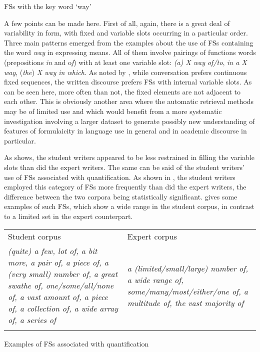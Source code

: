 \begin{table}
\caption{FSs with the key word ‘way’}
\label{tab:key:9}
\end{table}

A few points can be made here. First of all, again, there is a great deal of variability in form, with fixed and variable slots occurring in a particular order. Three main patterns emerged from the examples about the use of FSs containing the word \textit{way} in expressing means. All of them involve pairings of functions words (prepositions \textit{in} and o\textit{f}) with at least one variable slot: \textit{(a) X way of/to}, \textit{in a X way}, (\textit{the}) \textit{X way in which}. As noted by \citet{Biber2009}, while conversation prefers continuous fixed sequences, the written discourse prefers FSs with internal variable slots. As can be seen here, more often than not, the fixed elements are not adjacent to each other. This is obviously another area where the automatic retrieval methods may be of limited use and which would benefit from a more systematic investigation involving a larger dataset to generate possibly new understanding of features of formulaicity in language use in general and in academic discourse in particular. 

As  shows, the student writers appeared to be less restrained in filling the variable slots than did the expert writers. The same can be said of the student writers’ use of FSs associated with quantification. As shown in , the student writers employed this category of FSs more frequently than did the expert writers, the difference between the two corpora being statistically significant.  gives some examples of such FSs, which show a wide range in the student corpus, in contrast to a limited set in the expert counterpart. 


\begin{tabularx}{\textwidth}{XX}

\lsptoprule

Student corpus & Expert corpus\\
\textit{(quite) a few, lot of, a bit more, a pair of, a piece of, a (very small) number of, a great swathe of, one/some/all/none of, a vast amount of, a piece of, a collection of, a wide array of, a series of} & \textit{a (limited/small/large) number of, a wide range of, some/many/most/either/one of, a multitude of, the vast majority of}\\
\lspbottomrule
\end{tabularx}
\begin{table}
\caption{Examples of FSs associated with quantification}
\label{tab:key:10}
\end{table}

